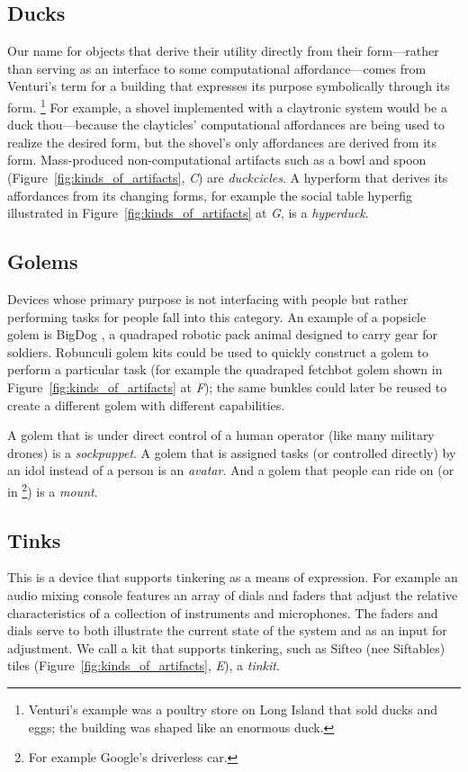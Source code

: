 \subsection{Ducks}
%
Our name for objects that derive their utility directly from their form---rather than serving as an interface to some computational affordance---comes from Venturi's term \citeyearpar{venturi_vegas} for a building that expresses its purpose symbolically through its form.%
\footnote{Venturi's example was a poultry store on Long Island that sold ducks and eggs; the building was shaped like an enormous duck.}
For example, a shovel implemented with a claytronic system would be a duck thou---because the clayticles' computational affordances are being used to realize the desired form, but the shovel's only affordances are derived from its form. 
Mass{}-produced non{}-computational artifacts such as a bowl and spoon (Figure~\ref{fig:kinds_of_artifacts}, \emph{C}) are \emph{duckcicles}. 
A hyperform that derives its affordances from its changing forms, for example the social table hyperfig illustrated in Figure~\ref{fig:kinds_of_artifacts} at \emph{G}, is a \emph{hyperduck}.

\subsection{Golems}
%
Devices whose primary purpose is not interfacing with people but rather performing tasks for people fall into this category. 
An example of a popsicle golem is BigDog \citep{bigdog}, a quadraped robotic pack animal designed to carry gear for soldiers. 
Robunculi golem kits could be used to quickly construct a golem to perform a particular task (for example the quadraped fetchbot golem shown in Figure~\ref{fig:kinds_of_artifacts} at \emph{F}); the same bunkles could later be reused to create a different golem with different capabilities. 

A golem that is under direct control of a human operator (like many military drones) is a \emph{sockpuppet}. A golem that is assigned tasks (or controlled directly) by an idol instead of a person is an \emph{avatar}. And a golem that people can ride on (or in%
\footnote{For example Google's driverless car.})
is a \emph{mount}.

\subsection{Tinks}
%
This is a device that supports tinkering as a means of expression. For example an audio mixing console features an array of dials and faders that adjust the relative characteristics of a collection of instruments and microphones. 
The faders and dials serve to both illustrate the current state of the system and as an input for adjustment. 
We call a kit that supports tinkering, such as Sifteo (nee Siftables) tiles \citep{siftables} (Figure~\ref{fig:kinds_of_artifacts}, \emph{E}), a \emph{tinkit}. 

